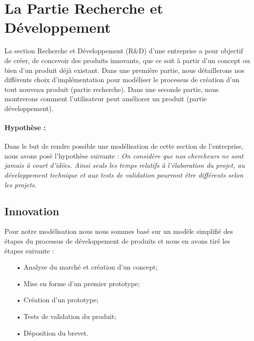 \section{La Partie Recherche et Développement}





La section Recherche et Développement (R\&D) d'une entreprise a pour objectif de créer, de concevoir des produits innovants, que ce soit à partir d'un concept ou bien d'un produit déjà existant. Dans une première partie, nous détaillerons nos différents choix d'implémentation pour modéliser le processus de création d'un tout nouveau produit (partie recherche). Dans une seconde partie, nous montrerons comment l'utilisateur peut améliorer un produit (partie développement).
\paragraph{Hypothèse :} Dans le but de rendre possible une modélisation de cette section de l'entreprise, nous avons posé l'hypothèse suivante : \textit{On considère que nos chercheurs ne sont jamais à court d'idées. Ainsi seuls les temps relatifs à l'élaboration du projet, au développement technique et aux tests de validation pourront être différents selon les projets}.

\subsection{Innovation}
Pour notre modélisation nous nous sommes basé sur un modèle simplifié des étapes du processus de développement de produits et nous en avons tiré les étapes suivante : 
\begin{enumerate}
\item[•] Analyse du marché et création d'un concept;
\item[•] Mise en forme d'un premier prototype;
\item[•] Création d'un prototype;
\item[•] Tests de validation du produit;
\item[•] Déposition du brevet.
\end{enumerate}
